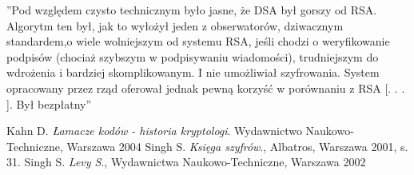 \documentclass[a4paper]{article}
\begin{document}
\begin{center}
”Pod względem czysto technicznym było jasne, że DSA był gorszy od RSA. Algorytm ten był,
jak to wyłożył jeden z obserwatorów, dziwacznym standardem,o wiele wolniejszym od systemu
RSA, jeśli chodzi o weryfikowanie podpisów (chociaż szybszym w podpisywaniu wiadomości),
trudniejszym do wdrożenia i bardziej skomplikowanym. I nie umożliwiał szyfrowania. System
opracowany przez rząd oferował jednak pewną korzyść w porównaniu z RSA [. . . ]. Był
bezpłatny” \cite{3}
\end{center}

\begin{thebibliography}{9}
Kahn D.
\textit{Łamacze kodów - historia kryptologi}.
Wydawnictwo Naukowo-Techniczne, Warszawa
2004
Singh S.
\textit{Księga szyfrów}.,
Albatros, Warszawa 2001, s. 31.
Singh S.
\textit{Levy S}.,
Wydawnictwa Naukowo-Techniczne, Warszawa 2002
\end{thebibliography}
\end{document}
